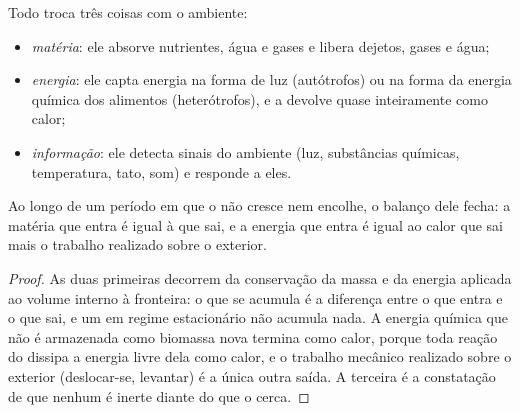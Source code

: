 \begin{proposition}\label{prop:b1:organism-environment:exchanges}
Todo  troca três coisas com o ambiente:
\begin{itemize}
  \item \emph{matéria}: ele absorve nutrientes,
        água e gases e libera dejetos, gases e água;
  \item \emph{energia}: ele capta energia na
        forma de luz (autótrofos) ou na forma da energia química dos
        alimentos (heterótrofos), e a devolve quase inteiramente como
        calor;
  \item \emph{informação}: ele detecta sinais
        do ambiente (luz, substâncias químicas, temperatura, tato, som)
        e responde a eles.
\end{itemize}
Ao longo de um período em que o  não cresce nem encolhe, o
balanço dele fecha: a matéria que entra é igual à que sai, e a energia
que entra é igual ao calor que sai mais o trabalho realizado sobre o
exterior.
\end{proposition}
\begin{proof}
As duas primeiras decorrem da conservação da massa e da energia aplicada
ao volume interno à fronteira: o que se acumula é a diferença entre o
que entra e o que sai, e um  em regime estacionário não acumula
nada. A energia química que não é armazenada como biomassa nova termina
como calor, porque toda reação do  dissipa a energia livre dela
como calor, e o trabalho mecânico realizado sobre o exterior
(deslocar-se, levantar) é a única outra saída. A terceira é a
constatação de que nenhum  é inerte diante do que o cerca.
\end{proof}

